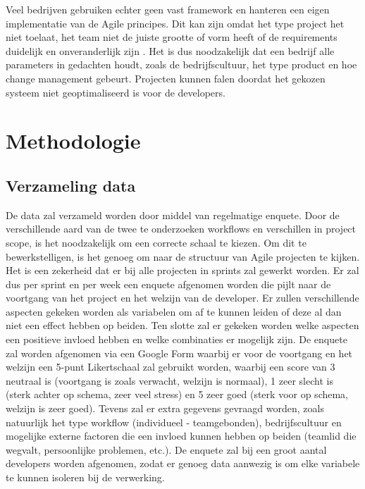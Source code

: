 Veel bedrijven gebruiken echter geen vast framework en hanteren een eigen implementatie van de Agile principes. Dit kan zijn omdat het type project het niet toelaat, het team niet de juiste grootte of vorm heeft of de requirements duidelijk en onveranderlijk zijn \autocite{Naekki2011}. Het is dus noodzakelijk dat een bedrijf alle parameters in gedachten houdt, zoals de bedrijfscultuur, het type product en hoe change management gebeurt. Projecten kunnen falen doordat het gekozen systeem niet geoptimaliseerd is voor de developers.


\section{Methodologie}
\label{sec:methodologie}


\subsection{Verzameling data}
De data zal verzameld worden door middel van regelmatige enquete. Door de verschillende aard van de twee te onderzoeken workflows en verschillen in project scope, is het noodzakelijk om een correcte schaal te kiezen. Om dit te bewerkstelligen, is het genoeg om naar de structuur van Agile projecten te kijken. Het is een zekerheid dat er bij alle projecten in sprints zal gewerkt worden. Er zal dus per sprint en per week een enquete afgenomen worden die pijlt naar de voortgang van het project en het welzijn van de developer. Er zullen verschillende aspecten gekeken worden als variabelen om af te kunnen leiden of deze al dan niet een effect hebben op beiden. Ten slotte zal er gekeken worden welke aspecten een positieve invloed hebben en welke combinaties er mogelijk zijn.
De enquete zal worden afgenomen via een Google Form waarbij er voor de voortgang en het welzijn een 5-punt Likertschaal zal gebruikt worden, waarbij een score van 3 neutraal is (voortgang is zoals verwacht, welzijn is normaal), 1 zeer slecht is (sterk achter op schema, zeer veel stress) en 5 zeer goed (sterk voor op schema, welzijn is zeer goed). Tevens zal er extra gegevens gevraagd worden, zoals natuurlijk het type workflow (individueel - teamgebonden), bedrijfscultuur en mogelijke externe factoren die een invloed kunnen hebben op beiden (teamlid die wegvalt, persoonlijke problemen, etc.).
De enquete zal bij een groot aantal developers worden afgenomen, zodat er genoeg data aanwezig is om elke variabele te kunnen isoleren bij de verwerking.

